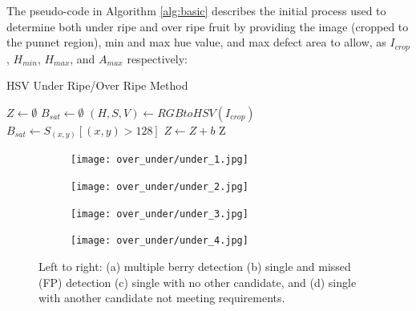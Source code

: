 \documentclass[fleqn,twoside,12pt]{report}
\begin{document}
The pseudo-code in Algorithm \ref{alg:basic} describes the initial process used to determine both under ripe and over ripe fruit by providing the image (cropped to the punnet region), min and max hue value, and max defect area to allow, as $I_{crop}$, $H_{min}$, $H_{max}$, and $A_{max}$ respectively:


\begin{algorithm}
	\caption{HSV Under Ripe/Over Ripe Method}
	\label{alg:basic}
	\begin{algorithmic}[1]
			\State $Z \gets \emptyset$
			\State $B_{sat} \gets \emptyset$
			\State $(H,S,V) \gets RGBtoHSV(I_{crop})$
			\State $B_{sat} \gets S_{(x, y)}[(x, y) > 128]$
					\State $Z \gets Z + b$
						\State \Return Z
					\EndIf
				\EndIf
			\EndFor
			\State {}
		\EndProcedure
	\end{algorithmic}
\end{algorithm}


\begin{figure}[ht]
	\centering
	\begin{subfigure}{.5\textwidth}
		\centering
		\texttt{[image: over\_under/under\_1.jpg]}
		\caption{}
		\label{fig:under_1}
	\end{subfigure}%
	\begin{subfigure}{.5\textwidth}
		\centering
		\texttt{[image: over\_under/under\_2.jpg]}
		\caption{}
		\label{fig:under_2}
	\end{subfigure}%
	
	\begin{subfigure}{.5\textwidth}
		\centering
		\texttt{[image: over\_under/under\_3.jpg]}
		\caption{}
		\label{fig:under_3}
	\end{subfigure}%
	\begin{subfigure}{.5\textwidth}
		\centering
		\texttt{[image: over\_under/under\_4.jpg]}
		\caption{}
		\label{fig:under_4}
	\end{subfigure}%
	
	\caption{Left to right: (a) multiple berry detection (b) single and missed (FP) detection (c) single with no other candidate, and (d) single with another candidate not meeting requirements.}
	\label{}
\end{figure}
\end{document}
